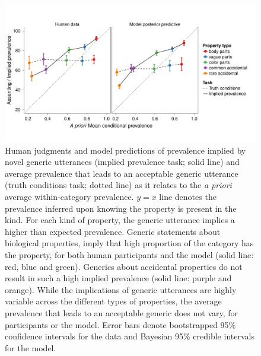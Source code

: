 \documentclass[10pt,letterpaper]{article}
\newcommand{\ndg}[1]{\textcolor{Green}{[ndg: #1]}}
\begin{document}
\begin{figure}
\centering
    \includegraphics[width=1\columnwidth]{asym-lines-data-model-2phi-2so-50kx3.pdf}
    \caption{Human judgments and model predictions of prevalence implied by novel generic utterances (implied prevalence task; solid line) and average prevalence that leads to an acceptable generic utterance (truth conditions task; dotted line) as it relates to the \emph{a priori} average within-category prevalence.
    $y = x$ line denotes the prevalence inferred upon knowing the property is present in the kind. 
    For each kind of property, the generic utterance implies a higher than expected prevalence.
    Generic statements about biological properties, imply that high proportion of the category has the property, for both human participants and the model (solid line: red, blue and green). 
    Generics about accidental properties do not result in such a high implied prevalence (solid line: purple and orange).  
	While the implications of generic utterances are highly variable across the different types of properties, the average prevalence that leads to an acceptable generic does not vary, for participants or the model.
    Error bars denote bootstrapped 95\% confidence intervals for the data and Bayesian 95\% credible intervals for the model.
}
  \label{fig:exp2b}
\end{figure}


\end{document}

